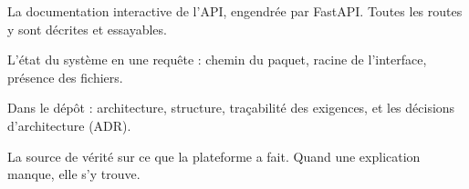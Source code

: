 \begin{description}[leftmargin=3.4cm, style=nextline]
  \item[\texttt{/docs}] La documentation interactive de l'API, engendrée par
        FastAPI. Toutes les routes y sont décrites et essayables.
  \item[\texttt{/health}] L'état du système en une requête : chemin du paquet,
        racine de l'interface, présence des fichiers.
  \item[\texttt{docs/}] Dans le dépôt : architecture, structure, traçabilité
        des exigences, et les décisions d'architecture (ADR).
  \item[Journal d'audit] La source de vérité sur ce que la plateforme a fait.
        Quand une explication manque, elle s'y trouve.
\end{description}

